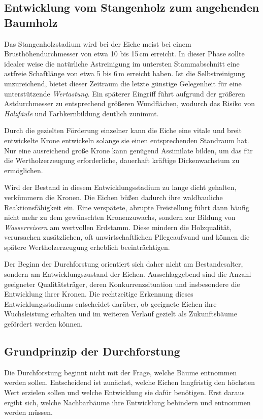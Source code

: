 \documentclass[twocolumn, bibliography=totoc, abstract=true]{scrartcl}
\begin{document}
\subsection{Entwicklung vom Stangenholz zum angehenden Baumholz}

Das Stangenholzstadium wird bei der Eiche meist bei einem Brusthöhendurchmesser von etwa 10 bis 15\,cm erreicht. In dieser Phase sollte idealer weise die natürliche Astreinigung im untersten Stammabschnitt eine astfreie Schaftlänge von etwa 5 bis 6\,m erreicht haben. Ist die Selbstreinigung unzureichend, bietet dieser Zeitraum die letzte günstige Gelegenheit für eine unterstützende \emph{Wertastung}. Ein späterer Eingriff führt aufgrund der größeren Astdurchmesser zu entsprechend größeren Wundflächen, wodurch das Risiko von \emph{Holzfäule} und Farbkernbildung deutlich zunimmt.

Durch die gezielten Förderung einzelner kann die Eiche eine vitale und breit entwickelte Krone entwickeln solange sie einen entsprechenden Standraum hat. Nur eine ausreichend große Krone kann genügend Assimilate bilden, um das für die Wertholzerzeugung erforderliche, dauerhaft kräftige Dickenwachstum zu ermöglichen.

Wird der Bestand in diesem Entwicklungsstadium zu lange dicht gehalten, verkümmern die Kronen. Die Eichen büßen dadurch ihre waldbauliche Reaktionsfähigkeit ein. Eine verspätete, abrupte Freistellung führt dann häufig nicht mehr zu dem gewünschten Kronenzuwachs, sondern zur Bildung von \emph{Wasserreisern} am wertvollen Erdstamm. Diese mindern die Holzqualität, verursachen zusätzlichen, oft unwirtschaftlichen Pflegeaufwand und können die spätere Wertholzerzeugung erheblich beeinträchtigen.

Der Beginn der Durchforstung orientiert sich daher nicht am Bestandesalter, sondern am Entwicklungszustand der Eichen. Ausschlaggebend sind die Anzahl geeigneter Qualitätsträger, deren Konkurrenzsituation und insbesondere die Entwicklung ihrer Kronen. Die rechtzeitige Erkennung dieses Entwicklungsstadiums entscheidet darüber, ob geeignete Eichen ihre Wuchsleistung erhalten und im weiteren Verlauf gezielt als Zukunftsbäume gefördert werden können.

\subsection{Grundprinzip der Durchforstung}

Die Durchforstung beginnt nicht mit der Frage, welche Bäume entnommen werden sollen. Entscheidend ist zunächst, welche Eichen langfristig den höchsten Wert erzielen sollen und welche Entwicklung sie dafür benötigen. Erst daraus ergibt sich, welche Nachbarbäume ihre Entwicklung behindern und entnommen werden müssen.
\end{document}
